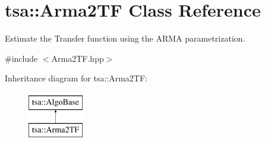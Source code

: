 \hypertarget{classtsa_1_1_arma2_t_f}{}\section{tsa\+:\+:Arma2\+TF Class Reference}
\label{classtsa_1_1_arma2_t_f}


Estimate the Transfer function using the A\+R\+MA parametrization.  




{\ttfamily \#include $<$Arma2\+T\+F.\+hpp$>$}

Inheritance diagram for tsa\+:\+:Arma2\+TF\+:\begin{figure}[H]
\begin{center}
\leavevmode
\includegraphics[height=2.000000cm]{classtsa_1_1_arma2_t_f}
\end{center}
\end{figure}
